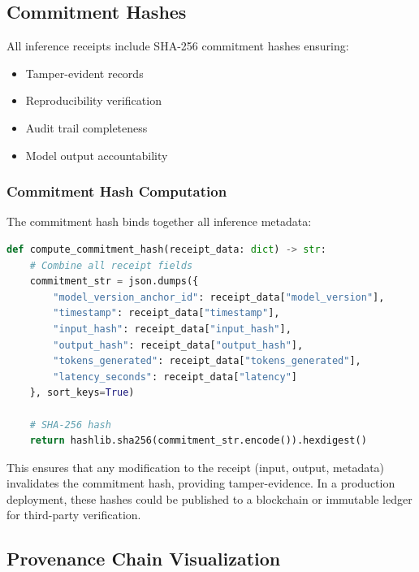 \documentclass[11pt,a4paper]{article}
\begin{document}
\subsection{Commitment Hashes}
All inference receipts include SHA-256 commitment hashes ensuring:
\begin{itemize}
    \item Tamper-evident records
    \item Reproducibility verification
    \item Audit trail completeness
    \item Model output accountability
\end{itemize}

\subsubsection{Commitment Hash Computation}
The commitment hash binds together all inference metadata:

\begin{lstlisting}[language=Python, basicstyle=\small\ttfamily, breaklines=true]
def compute_commitment_hash(receipt_data: dict) -> str:
    # Combine all receipt fields
    commitment_str = json.dumps({
        "model_version_anchor_id": receipt_data["model_version"],
        "timestamp": receipt_data["timestamp"],
        "input_hash": receipt_data["input_hash"],
        "output_hash": receipt_data["output_hash"],
        "tokens_generated": receipt_data["tokens_generated"],
        "latency_seconds": receipt_data["latency"]
    }, sort_keys=True)
    
    # SHA-256 hash
    return hashlib.sha256(commitment_str.encode()).hexdigest()
\end{lstlisting}

This ensures that any modification to the receipt (input, output, metadata) invalidates the commitment hash, providing tamper-evidence. In a production deployment, these hashes could be published to a blockchain or immutable ledger for third-party verification.

\subsection{Provenance Chain Visualization}
\end{document}
